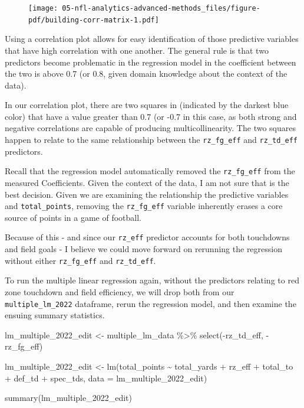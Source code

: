 \documentclass[
  letterpaper,
]{krantz}
\newenvironment{Shaded}{\begin{snugshade}}{\end{snugshade}}
\newcommand{\AttributeTok}[1]{\textcolor[rgb]{0.40,0.45,0.13}{#1}}
\newcommand{\FunctionTok}[1]{\textcolor[rgb]{0.28,0.35,0.67}{#1}}
\newcommand{\NormalTok}[1]{\textcolor[rgb]{0.00,0.23,0.31}{#1}}
\newcommand{\OtherTok}[1]{\textcolor[rgb]{0.00,0.23,0.31}{#1}}
\newcommand{\SpecialCharTok}[1]{\textcolor[rgb]{0.37,0.37,0.37}{#1}}
\begin{document}
\begin{tcolorbox}
\begin{figure}[H]

{\centering \texttt{[image: 05-nfl-analytics-advanced-methods\_files/figure-pdf/building-corr-matrix-1.pdf]}

}

\end{figure}

Using a correlation plot allows for easy identification of those
predictive variables that have high correlation with one another. The
general rule is that two predictors become problematic in the regression
model in the coefficient between the two is above 0.7 (or 0.8, given
domain knowledge about the context of the data).

In our correlation plot, there are two squares in (indicated by the
darkest blue color) that have a value greater than 0.7 (or -0.7 in this
case, as both strong and negative correlations are capable of producing
multicollinearity. The two squares happen to relate to the same
relationship between the \texttt{rz\_fg\_eff} and \texttt{rz\_td\_eff}
predictors.

Recall that the regression model automatically removed the
\texttt{rz\_fg\_eff} from the measured Coefficients. Given the context
of the data, I am not sure that is the best decision. Given we are
examining the relationship the predictive variables and
\texttt{total\_points}, removing the \texttt{rz\_fg\_eff} variable
inherently erases a core source of points in a game of football.

Because of this - and since our \texttt{rz\_eff} predictor accounts for
both touchdowns and field goals - I believe we could move forward on
rerunning the regression without either \texttt{rz\_fg\_eff} and
\texttt{rz\_td\_eff}.

\end{tcolorbox}

To run the multiple linear regression again, without the predictors
relating to red zone touchdown and field efficiency, we will drop both
from our \texttt{multiple\_lm\_2022} dataframe, rerun the regression
model, and then examine the ensuing summary statistics.

\begin{Shaded}
\begin{Highlighting}[]
\NormalTok{lm\_multiple\_2022\_edit }\OtherTok{\textless{}{-}}\NormalTok{ multiple\_lm\_data }\SpecialCharTok{\%\textgreater{}\%}
  \FunctionTok{select}\NormalTok{(}\SpecialCharTok{{-}}\NormalTok{rz\_td\_eff, }\SpecialCharTok{{-}}\NormalTok{rz\_fg\_eff)}

\NormalTok{lm\_multiple\_2022\_edit }\OtherTok{\textless{}{-}} \FunctionTok{lm}\NormalTok{(total\_points }\SpecialCharTok{\textasciitilde{}}\NormalTok{ total\_yards }\SpecialCharTok{+}\NormalTok{ rz\_eff }\SpecialCharTok{+}
\NormalTok{                         total\_to }\SpecialCharTok{+}\NormalTok{ def\_td }\SpecialCharTok{+}\NormalTok{ spec\_tds,}
                         \AttributeTok{data =}\NormalTok{ lm\_multiple\_2022\_edit)}

\FunctionTok{summary}\NormalTok{(lm\_multiple\_2022\_edit)}
\end{Highlighting}
\end{Shaded}
\end{document}
